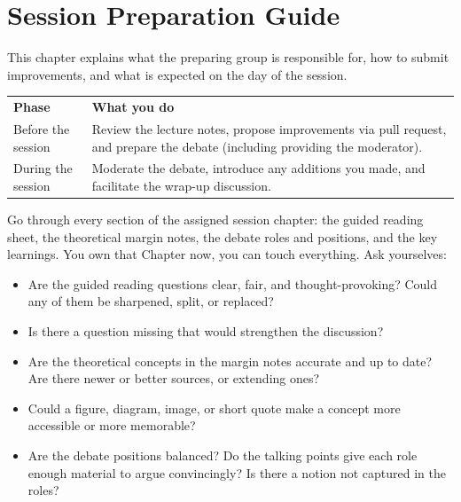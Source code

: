 \chapter{Session Preparation Guide} 

 This chapter
explains what the preparing group is responsible for, how to submit
improvements, and what is expected on the day of the session.

\vspace{1em}


\noindent\begin{tabular}{@{}p{3.8cm}p{6.5cm}@{}}
    \textbf{Phase} & \textbf{What you do} \\[4pt]
    Before the session &
        Review the lecture notes, propose improvements via pull request,
        and prepare the debate (including providing the moderator). \\[6pt]
    During the session &
        Moderate the debate, introduce any additions you made, and
        facilitate the wrap-up discussion. \\
\end{tabular}

 Go through every section of the
assigned session chapter: the guided reading sheet, the theoretical margin
notes, the debate roles and positions, and the key learnings. You own that Chapter now, you can touch everything. Ask
yourselves:

\begin{itemize}
    \item Are the guided reading questions clear, fair, and thought-provoking?
          Could any of them be sharpened, split, or replaced?
    \item Is there a question missing that would strengthen the discussion?
    \item Are the theoretical concepts in the margin notes accurate and
          up to date? Are there newer or better sources, or extending ones?
    \item Could a figure, diagram, image, or short quote make a concept
          more accessible or more memorable?
    \item Are the debate positions balanced? Do the talking points give
          each role enough material to argue convincingly? Is there a notion not captured in the roles?
\end{itemize}

